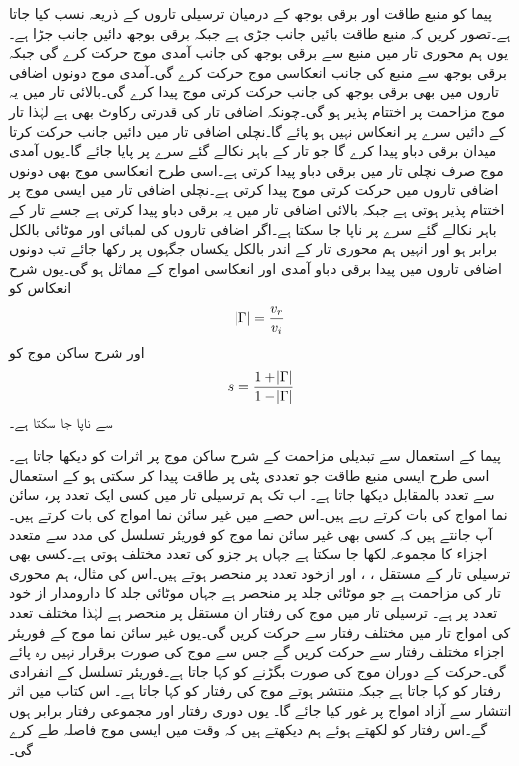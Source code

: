 پیما کو منبع طاقت اور برقی بوجھ کے درمیان ترسیلی تاروں کے ذریعہ نسب کیا جاتا ہے۔تصور کریں کہ منبع طاقت بائیں جانب جڑی  ہے جبکہ برقی بوجھ دائیں جانب جڑا ہے۔یوں ہم محوری تار میں منبع سے برقی بوجھ کی جانب آمدی موج حرکت کرے گی جبکہ برقی بوجھ سے منبع کی جانب انعکاسی موج حرکت کرے گی۔آمدی موج دونوں اضافی تاروں میں بھی برقی بوجھ کی جانب حرکت کرتی موج پیدا کرے گی۔بالائی تار میں یہ موج مزاحمت  پر اختتام پذیر ہو گی۔چونکہ اضافی تار کی قدرتی رکاوٹ بھی  ہے لہٰذا تار کے دائیں سرے پر انعکاس نہیں ہو پائے گا۔نچلی اضافی تار میں دائیں جانب حرکت کرتا میدان  برقی دباو  پیدا کرے گا جو تار کے باہر نکالے گئے سرے پر پایا جائے گا۔یوں آمدی موج صرف نچلی تار میں برقی دباو پیدا کرتی ہے۔اسی طرح انعکاسی موج بھی دونوں اضافی تاروں میں حرکت کرتی موج پیدا کرتی ہے۔نچلی اضافی تار میں ایسی موج  پر اختتام پذیر ہوتی ہے جبکہ بالائی اضافی تار میں یہ  برقی دباو پیدا کرتی ہے جسے تار کے باہر نکالے گئے سرے پر ناپا جا سکتا ہے۔اگر اضافی تاروں کی لمبائی اور موٹائی بالکل برابر ہو اور انہیں ہم محوری تار کے اندر بالکل یکساں جگہوں پر رکھا جائے تب دونوں اضافی تاروں میں پیدا برقی دباو آمدی اور انعکاسی امواج کے مماثل ہو گی۔یوں شرح انعکاس کو
\begin{align}
\abs{\Gamma}=\frac{v_r}{v_i}
\end{align}
اور شرح ساکن موج کو
\begin{align}
s=\frac{1+\abs{\Gamma}}{1-\abs{\Gamma}}
\end{align}
سے ناپا جا سکتا ہے۔

پیما کے استعمال سے  تبدیلی مزاحمت کے شرح ساکن موج پر اثرات کو دیکھا جاتا ہے۔اسی طرح ایسی منبع طاقت جو تعددی پٹی پر طاقت پیدا کر سکتی ہو کے استعمال سے تعدد بالمقابل  دیکھا جاتا ہے۔
اب تک ہم  ترسیلی تار میں کسی ایک تعدد پر،  سائن نما امواج کی بات کرتے رہے ہیں۔اس حصے میں غیر سائن نما امواج کی بات کرتے ہیں۔آپ جانتے ہیں کہ کسی بھی غیر سائن نما موج کو فوریئر تسلسل کی مدد سے متعدد اجزاء کا مجموعہ لکھا جا سکتا ہے جہاں ہر جزو کی تعدد مختلف ہوتی ہے۔کسی بھی ترسیلی تار کے مستقل ، ،  اور  ازخود تعدد پر منحصر ہوتے ہیں۔اس کی مثال، ہم محوری تار کی مزاحمت ہے جو موٹائی جلد پر منحصر ہے جہاں موٹائی جلد کا دارومدار از خود تعدد پر ہے۔ ترسیلی تار میں موج کی رفتار ان مستقل پر منحصر ہے لہٰذا مختلف تعدد کی امواج تار میں مختلف رفتار سے حرکت کریں گی۔یوں غیر سائن نما موج کے فوریئر اجزاء مختلف رفتار سے حرکت کریں گے جس سے موج کی صورت برقرار نہیں رہ پائے گی۔حرکت کے دوران موج کی صورت بگڑنے کو  کہا جاتا ہے۔فوریئر تسلسل کے انفرادی رفتار  کو  کہا جاتا ہے جبکہ منتشر ہوتے موج کی رفتار  کو  کہا جاتا ہے۔ اس کتاب میں اثر انتشار سے آزاد امواج پر غور کیا جائے گا۔ یوں دوری رفتار اور مجموعی رفتار برابر ہوں گے۔اس رفتار کو  لکھتے ہوئے ہم دیکھتے ہیں کہ وقت  میں ایسی موج   فاصلہ طے کرے گی۔

